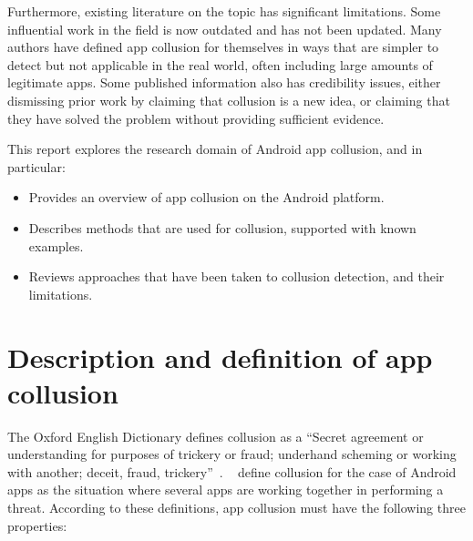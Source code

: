 \documentclass[article, oneside]{aaltoseries}
\newcommand{\TODO}[1]{\todo[inline]{#1}}
\newcommand{\Sref}[1]{Section~\ref{#1}}
\begin{document}
Furthermore, existing literature on the topic has
significant limitations. Some influential work in the field
is now outdated and has not been updated. Many authors have
defined app collusion for themselves in ways that are
simpler to detect but not applicable in the real world,
often including large amounts of legitimate apps. Some
published information also has
credibility issues, either dismissing prior work by claiming
that collusion is a new idea, or claiming that they have
solved the problem without providing sufficient evidence.

This report explores the research domain of Android app
collusion, and in particular:
%
\begin{itemize}
	\item Provides an overview of app collusion on the
	Android platform.

	\item Describes methods that are used for collusion,
	supported with known examples.

	\item Reviews approaches that have been taken to
	collusion detection, and their limitations.
\end{itemize}
%


\section{Description and definition of app collusion}
\label{sec:def}
%
\TODO{Consider section preview}

The Oxford English Dictionary defines collusion as a
``Secret agreement or understanding for purposes of trickery
or fraud; underhand scheming or working with another;
deceit, fraud, trickery''~\cite{OEDcollusion}.
\citeauthor{Asavoae2017}~\cite{Asavoae2017} define collusion
for the case of Android apps as the situation where several
apps are working together in performing a threat. According
to these definitions, app collusion must have the following
three properties:
\end{document}
